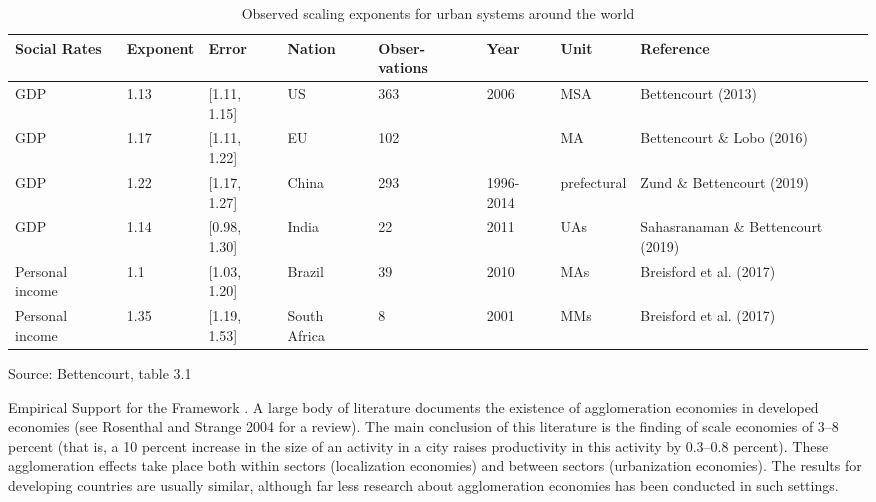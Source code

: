 \begin{table}[htb]\small
\centering
\begin{tabular}{|p{1.5cm}|l|l|p{1.5cm}|p{1.4cm}|p{}|l|p{2.5cm}|}\hline
\textbf{Social Rates} & \textbf{Exponent} & \textbf{Error} & \textbf{Nation} & \textbf{Obser-vations} & \textbf{Year} & \textbf{Unit} & \textbf{Reference} \\ \hline   
GDP             & 1.13 & [1.11, 1.15]  & US           & 363 & 2006        & MSA  & Bettencourt (2013)                 \\ \hline
GDP             & 1.17 & [1.11, 1.22]  & EU           & 102 &             & MA   & Bettencourt  \& Lobo        (2016) \\ \hline
GDP             & 1.22 & [1.17, 1.27]  & China        & 293 & 1996-2014   & prefectural & Zund  \& Bettencourt (2019) \\ \hline
GDP             & 1.14 & [0.98, 1.30]  & India        & 22  & 2011        & UAs  & Sahasranaman \& Bettencourt (2019) \\ \hline
Personal income & 1.1  & [1.03, 1.20]  & Brazil       & 39  & 2010        & MAs  & Breisford et al.  (2017)           \\ \hline
Personal income & 1.35 & [1.19, 1.53]  & South Africa & 8   & 2001        & MMs  & Breisford et al.  (2017)           \\ \hline
\end{tabular}
\caption[Observed scaling exponents]{Observed scaling exponents for urban systems around the world}
\label{table-scaling-exponents}
\small Source: Bettencourt, table 3.1

\end{table}

Empirical Support for the Framework \cite{spenceUrbanizationGrowth2009, durantonAreCitiesEngines2009, durantonHumanCapitalExternalities2007}. 
A large body of literature documents the existence of agglomeration economies in developed economies (see Rosenthal and Strange 2004 for a review). The main conclusion of this literature is the finding of scale economies of 3--8 percent (that is, a 10 percent increase in the size of an activity in a city raises productivity in this activity by 0.3--0.8 percent). These agglomeration effects take place both within sectors (localization economies) and between sectors (urbanization economies). The results for developing countries are usually similar, although far less research about agglomeration economies has been conducted in such settings.

